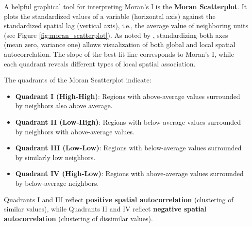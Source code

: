 \documentclass[english,12pt]{book}\usepackage[]{graphicx}\usepackage[]{xcolor}
\begin{document}
A helpful graphical tool for interpreting Moran’s I is the \textbf{Moran Scatterplot}. It plots the standardized values of a variable (horizontal axis) against the standardized spatial lag (vertical axis), i.e., the average value of neighboring units (see Figure \ref{fig:moran_scatterplot}). As noted by \citet{anselin1996chapter}, standardizing both axes (mean zero, variance one) allows visualization of both global and local spatial autocorrelation. The slope of the best-fit line corresponds to Moran’s I, while each quadrant reveals different types of local spatial association.

The quadrants of the Moran Scatterplot indicate:

\begin{itemize}
  \item \textbf{Quadrant I (High-High)}: Regions with above-average values surrounded by neighbors also above average.
  \item \textbf{Quadrant II (Low-High)}: Regions with below-average values surrounded by neighbors with above-average values.
  \item \textbf{Quadrant III (Low-Low)}: Regions with below-average values surrounded by similarly low neighbors.
  \item \textbf{Quadrant IV (High-Low)}: Regions with above-average values surrounded by below-average neighbors.
\end{itemize}

Quadrants I and III reflect \textbf{positive spatial autocorrelation} (clustering of similar values), while Quadrants II and IV reflect \textbf{negative spatial autocorrelation} (clustering of dissimilar values).
\end{document}
